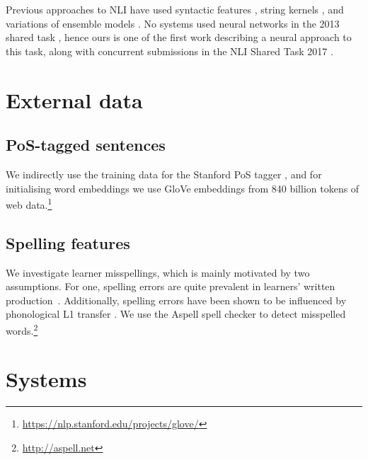 \documentclass[11pt,letterpaper]{article}
\begin{document}
Previous approaches to NLI have used syntactic features \citep{bykh:2014}, string kernels \citep{ionescu:2014}, and variations of ensemble models \citep{malmasi:2017:nlisg,nli2013}.
No systems used neural networks in the 2013 shared task \citep{nli2013}, hence ours is one of the first work describing a neural approach to this task, along with concurrent submissions in the NLI Shared Task 2017 \citep{nli2017}.

\section{External data}

\subsection{PoS-tagged sentences}
We indirectly use the training data for the Stanford PoS tagger
\citep{Manning2014corenlp}, and for initialising word embeddings we use
GloVe embeddings from 840 billion tokens of web data.\footnote{\url{https://nlp.stanford.edu/projects/glove/}}

\subsection{Spelling features}
We investigate learner misspellings, which is mainly motivated by two assumptions.
For one, spelling errors are quite prevalent in learners' written production~\cite{kochmar2011}.
Additionally, spelling errors have been shown to be influenced by phonological L1 transfer \citep{grigonyte2014pronunciation}.
We use the Aspell spell checker to detect misspelled words.\footnote{\url{http://aspell.net}}

\section{Systems}
\end{document}
